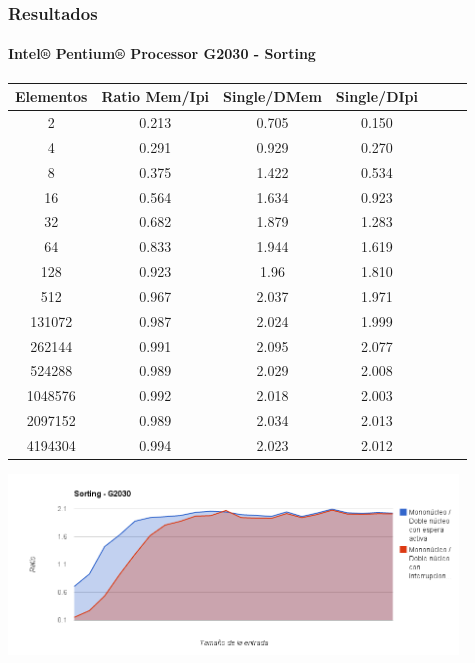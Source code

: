 \documentclass{beamer}
\begin{document}
	\begin{frame}
		\frametitle{Resultados}
		\framesubtitle{Intel® Pentium® Processor G2030 - Sorting}
		\begin{center}
			\begin{tabular}{|c|c|c|c|c|c|c|}
				\hline	
					Elementos & Ratio Mem/Ipi & Single/DMem & Single/DIpi\\
				\hline
					2 & 0.213 & 0.705 &  0.150\\
				\hline
					4 & 0.291 & 0.929 &  0.270\\
				\hline
					8 & 0.375 & 1.422 &  0.534\\
				\hline
					16 & 0.564 & 1.634 &  0.923\\
				\hline
					32 & 0.682 & 1.879 &  1.283\\
				\hline
					64 & 0.833 & 1.944 &  1.619\\
				\hline
					128 & 0.923 & 1.96 &  1.810\\
				\hline
					512 & 0.967 & 2.037 &  1.971\\
				\hline
					131072 & 0.987 & 2.024 &  1.999\\
				\hline
					262144 & 0.991 & 2.095 &  2.077\\
				\hline
					524288 & 0.989 & 2.029 &  2.008\\
				\hline
					1048576 & 0.992 & 2.018 &  2.003\\
				\hline
					2097152 & 0.989 & 2.034 &  2.013\\
				\hline
					4194304 & 0.994 & 2.023 &  2.012\\
				\hline
			\end{tabular}
			\end{center}
		\end{frame}
		\begin{frame}
		\begin{center}
		    \includegraphics[height=4.8cm]{images/sort_ipis_g2030.png}
		\end{center}
	\end{frame}
\end{document}
